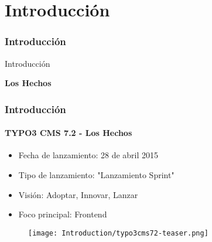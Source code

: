 %

\section{Introducción}
\begin{frame}[fragile]
	\frametitle{Introducción}

	\begin{center}\huge{Introducción}\end{center}
	\begin{center}\huge{\color{typo3darkgrey}\textbf{Los Hechos}}\end{center}

\end{frame}

\begin{frame}[fragile]
	\frametitle{Introducción}
	\framesubtitle{TYPO3 CMS 7.2 - Los Hechos}

	\begin{itemize}
		\item Fecha de lanzamiento: 28 de abril 2015
		\item Tipo de lanzamiento: "Lanzamiento Sprint"
		\item Visión: Adoptar, Innovar, Lanzar
		\item Foco principal: Frontend
	\end{itemize}

	\begin{figure}
		\texttt{[image: Introduction/typo3cms72-teaser.png]}
	\end{figure}

\end{frame}

